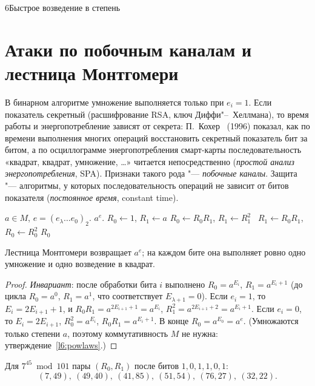 \begin{lecture}{6}{Быстрое возведение в степень}
\section{Атаки по побочным каналам и лестница Монтгомери}

В бинарном алгоритме умножение выполняется только при $e_i = 1$. Если показатель секретный
(расшифрование RSA, ключ Диффи"--~Хеллмана), то время работы и энергопотребление зависят от
секрета: П.~Кохер~\cite{kocher-timing} (1996) показал, как по времени выполнения многих
операций восстановить секретный показатель бит за битом, а по осциллограмме
энергопотребления смарт-карты последовательность «квадрат, квадрат, умножение, \dots»
читается непосредственно (\emph{простой анализ энергопотребления}, SPA). Признаки такого
рода "--- \emph{побочные каналы}. Защита "--- алгоритмы, у которых последовательность операций
не зависит от битов показателя (\emph{постоянное время}, constant time).

\begin{algorithm}\label{l6:ladder}
\begin{algorithmic}[1]
\Require $a \in M$, $e = (e_\lambda \dots e_0)_2$.
\Ensure $a^e$.
\State $R_0 \gets 1$, $R_1 \gets a$
   $R_0 \gets R_0 R_1$, \quad $R_1 \gets R_1^2$
  \Else\ $R_1 \gets R_0 R_1$, \quad $R_0 \gets R_0^2$ \EndIf
\EndFor
\State \Return $R_0$
\end{algorithmic}
\end{algorithm}

\begin{theorem}\label{l6:ladder-correct}
Лестница Монтгомери возвращает $a^e$; на каждом бите она выполняет ровно одно умножение и одно
возведение в квадрат.
\end{theorem}

\begin{proof}
\emph{Инвариант}: после обработки бита $i$ выполнено $R_0 = a^{E_i}$, $R_1 = a^{E_i + 1}$
(до цикла $R_0 = a^0$, $R_1 = a^1$, что соответствует $E_{\lambda+1} = 0$). Если $e_i = 1$, то
$E_i = 2E_{i+1} + 1$, и $R_0 R_1 = a^{2E_{i+1} + 1} = a^{E_i}$, $R_1^2 = a^{2E_{i+1} + 2} = a^{E_i+1}$.
Если $e_i = 0$, то $E_i = 2E_{i+1}$, $R_0^2 = a^{E_i}$, $R_0 R_1 = a^{E_i + 1}$. В конце
$R_0 = a^{E_0} = a^e$. (Умножаются только степени $a$, поэтому коммутативность $M$ не нужна:
утверждение~\ref{l6:powlaws}.)
\end{proof}

Для $7^{45} \bmod 101$ пары $(R_0, R_1)$ после битов $1, 0, 1, 1, 0, 1$:
\[
  (7, 49),\ (49, 40),\ (41, 85),\ (51, 54),\ (76, 27),\ (32, 22).
\]


\end{lecture}
